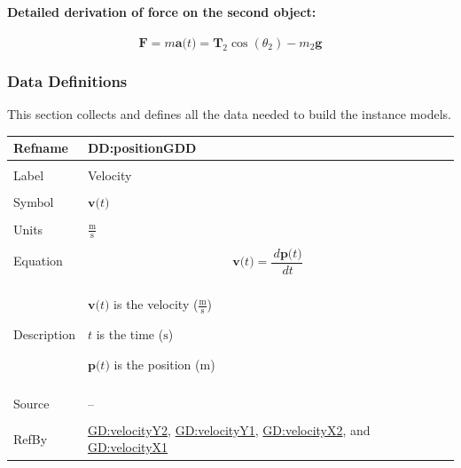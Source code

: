\documentclass[12pt]{article}
\begin{document}
\paragraph{Detailed derivation of force on the second object:}
\label{GD:yForce2Deriv}
\begin{displaymath}
\symbf{F}=m \symbf{a}\text{(}t\text{)}={\symbf{T}_{2}} \cos\left({θ_{2}}\right)-{m_{2}} \symbf{g}
\end{displaymath}
\subsubsection{Data Definitions}
\label{Sec:DDs}
This section collects and defines all the data needed to build the instance models.

\vspace{\baselineskip}
\noindent
\begin{minipage}{\textwidth}
\begin{tabular}{>{\raggedright}p{}>{\raggedright\arraybackslash}p{}}
\toprule \textbf{Refname} & \textbf{DD:positionGDD}
\label{DD:positionGDD}
\\ \midrule \\
Label & Velocity
        
\\ \midrule \\
Symbol & $\symbf{v}\text{(}t\text{)}$
         
\\ \midrule \\
Units & $\frac{\text{m}}{\text{s}}$
        
\\ \midrule \\
Equation & \begin{displaymath}
           \symbf{v}\text{(}t\text{)}=\frac{\,d\symbf{p}\text{(}t\text{)}}{\,dt}
           \end{displaymath}
\\ \midrule \\
Description & \begin{symbDescription}
              \item{$\symbf{v}\text{(}t\text{)}$ is the velocity ($\frac{\text{m}}{\text{s}}$)}
              \item{$t$ is the time (${\text{s}}$)}
              \item{$\symbf{p}\text{(}t\text{)}$ is the position (${\text{m}}$)}
              \end{symbDescription}
\\ \midrule \\
Source & --
         
\\ \midrule \\
RefBy & \hyperref[GD:velocityY2]{GD:velocityY2}, \hyperref[GD:velocityY1]{GD:velocityY1}, \hyperref[GD:velocityX2]{GD:velocityX2}, and \hyperref[GD:velocityX1]{GD:velocityX1}
        
\\ \bottomrule
\end{tabular}
\end{minipage}
\end{document}
